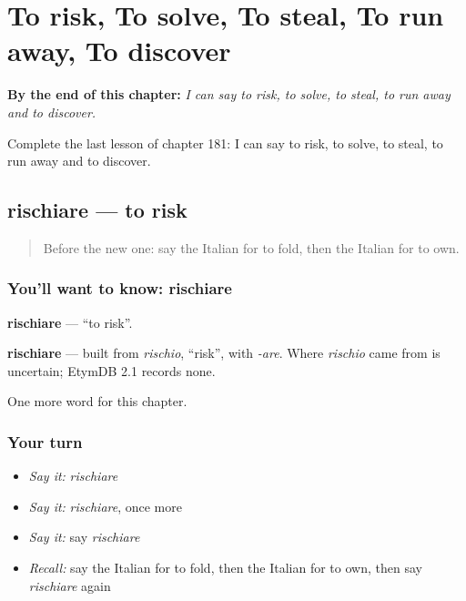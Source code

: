 
\chapter{To risk, To solve, To steal, To run away, To discover}
\label{ch:it-to-risk-to-solve-to-steal-to-run-away-to-discover}

\begin{chapteropening}
\textbf{By the end of this chapter:} \emph{I can say to risk, to solve, to steal, to run away and to discover.}

Complete the last lesson of chapter 181: I can say to risk, to solve, to steal, to run away and to discover.
\end{chapteropening}

\section[rischiare]{rischiare — to risk}

\label{lesson:IT-C181-rischiare}



\begin{quote}
Before the new one: say the Italian for to fold, then the Italian for to own.
\end{quote}

\subsection*{You'll want to know: rischiare}
\textbf{rischiare} — \textquotedblleft{}to risk\textquotedblright{}.

\begin{cousinweb}
\textbf{rischiare} — built from \emph{rischio}, \textquotedblleft{}risk\textquotedblright{}, with \emph{-are}. Where \emph{rischio} came from is uncertain; EtymDB 2.1 records none.
\end{cousinweb}

\begin{grammarlens}[title={What you've built}]
One more word for this chapter.
\end{grammarlens}

\subsection*{Your turn}
\begin{itemize}
\raggedright
  \item \emph{Say it:} \emph{rischiare}
  \item \emph{Say it:} \emph{rischiare}, once more
  \item \emph{Say it:} say \emph{rischiare}
  \item \emph{Recall:} say the Italian for to fold, then the Italian for to own, then say \emph{rischiare} again
\end{itemize}

